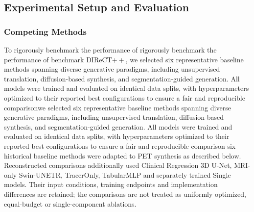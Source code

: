 \documentclass{article}
\providecommand{\DIFaddtex}[1]{{\protect\color{blue} \sf #1}} %
\providecommand{\DIFdeltex}[1]{{\protect\color{red} \ifmmode #1\else\scriptsize #1\fi}} %
\providecommand{\DIFaddbegin}{} %
\providecommand{\DIFaddend}{} %
\providecommand{\DIFdelbegin}{} %
\providecommand{\DIFdelend}{} %
\providecommand{\DIFadd}[1]{\texorpdfstring{\DIFaddtex{#1}}{#1}} %
\providecommand{\DIFdel}[1]{\texorpdfstring{\DIFdeltex{#1}}{}} %
\newcommand{\DIFscaledelfig}{0.5}
\newlength{\DIFdelgraphicswidth} %
\newlength{\DIFdelgraphicsheight} %
\newcommand{\DIFaddincludegraphics}[2][]{{\color{blue}\fbox{\DIFOincludegraphics[#1]{#2}}}} %
\newcommand{\DIFdelincludegraphics}[2][]{%
\sbox{\DIFdelgraphicsbox}{\DIFOincludegraphics[#1]{#2}}%
\settoboxwidth{\DIFdelgraphicswidth}{\DIFdelgraphicsbox} %
\settoboxtotalheight{\DIFdelgraphicsheight}{\DIFdelgraphicsbox} %
\scalebox{\DIFscaledelfig}{%
\parbox[b]{\DIFdelgraphicswidth}{\usebox{\DIFdelgraphicsbox}\\[-\baselineskip] \rule{\DIFdelgraphicswidth}{0em}}\llap{\resizebox{\DIFdelgraphicswidth}{\DIFdelgraphicsheight}{%
\setlength{\unitlength}{\DIFdelgraphicswidth}%
\begin{picture}(1,1)%
\thicklines\linethickness{2pt} %
{\color[rgb]{1,0,0}\put(0,0){\framebox(1,1){}}}%
{\color[rgb]{1,0,0}\put(0,0){\line( 1,1){1}}}%
{\color[rgb]{1,0,0}\put(0,1){\line(1,-1){1}}}%
\end{picture}%
}\hspace*{3pt}}} %
} %
\DeclareRobustCommand{\DIFaddbegin}{\DIFOaddbegin \let\includegraphics\DIFaddincludegraphics} %
\DeclareRobustCommand{\DIFaddend}{\DIFOaddend \let\includegraphics\DIFOincludegraphics} %
\DeclareRobustCommand{\DIFdelbegin}{\DIFOdelbegin \let\includegraphics\DIFdelincludegraphics} %
\DeclareRobustCommand{\DIFdelend}{\DIFOaddend \let\includegraphics\DIFOincludegraphics} %
\begin{document}
\subsection{Experimental Setup and Evaluation}
\subsubsection{Competing Methods}
To \DIFdelbegin \DIFdel{rigorously benchmark the performance of }\DIFdelend \DIFaddbegin \DIFadd{benchmark }\DIFaddend DIReCT$++$, \DIFdelbegin \DIFdel{we selected six representative baseline methods spanning diverse generative paradigms, including unsupervised translation, diffusion-based synthesis, and segmentation-guided generation. All models were trained and evaluated on identical data splits, with hyperparameters optimized to their reported best configurations to ensure a fair and reproducible comparison}\DIFdelend \DIFaddbegin \DIFadd{six historical baseline methods were adapted to PET synthesis as described below. Reconstructed comparisons additionally used Clinical Regression 3D U-Net, MRI-only Swin-UNETR, TracerOnly, TabularMLP and separately trained Single models. Their input conditions, training endpoints and implementation differences are retained; the comparisons are not treated as uniformly optimized, equal-budget or single-component ablations}\DIFaddend .
\end{document}
